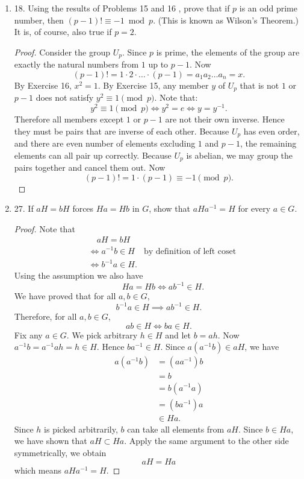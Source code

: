 \begin{enumerate}
\item 18. Using the results of Problems 15 and 16 , prove that if $p$ is an odd prime number, then $(p-1) ! \equiv-1 \bmod p$. (This is known as Wilson's Theorem.) It is, of course, also true if $p=2$. 
\begin{proof}
	Consider the group $U_p$. Since $p$ is prime, the elements of the group are exactly the natural numbers from $1$ up to $p -1$. Now
	\[
		(p-1)! = 1 \cdot 2 \cdot \ldots \cdot (p-1) =  a_1 a_2 \ldots a_n = x
	.\] 
By Exercise 16, $x^2 = 1$. By Exercise 15, any member $y$ of  $U_p$ that is not $1$ or $p -1$ does not satisfy $y^2 \equiv 1 \pmod p$. Note that: \[
	y^2 \equiv 1 \pmod p \iff y^2 = e \iff y = y^{-1} 
.\] 
Therefore all members except $1 $ or $p -1$ are not their own inverse. Hence they must be pairs that are inverse of each other. Because $U_p$ has even order, and there are even number of elements excluding $1$ and $p -1$, the remaining elements can all pair up correctly. Because  $U_p$ is abelian, we may group the pairs together and cancel them out. Now
\[
	(p-1)! = 1 \cdot (p-1) \equiv -1 \pmod p
.\] 
	
\end{proof}

\item 27. If $a H=b H$ forces $H a=H b$ in $G$, show that $a H a^{-1}=H$ for every $a \in G$. 
\begin{proof}
	Note that 
	\begin{align*}
		& \quad a H = b H \\
		& \iff a^{-1} b \in H  & \text{by definition of left coset}\\
		& \iff b^{-1}  a \in H
	.\end{align*}
	Using the assumption we also have
	\[
		\quad H a = H b 
		\iff a b^{-1}  \in H
		.
	\]
	We have proved that for all $a, b \in G$, \[
		b^{-1} a \in H \implies a b^{-1}  \in H
	.\] 
	Therefore, for all $a, b \in G$, 
	\[
		a b \in H \iff b a \in H
	.\] 
	Fix any $a \in G$. We pick arbitrary $h \in H$ and let $b = a h$. Now $a^{-1} b = a^{-1} a h = h \in H$. Hence $b a^{-1} \in H$. Since $a(a^{-1} b) \in a H$, we have
	\begin{align*}
		a(a^{-1} b)
		&= (a a^{-1} ) b \\
		&= b \\
		&= b (a^{-1} a) \\
		&= (b a^{-1} ) a \\
		&\in H a
	.\end{align*}
	Since $h$ is picked arbitrarily, $b$ can take all elements from $aH$. Since $b \in Ha$, we have shown that $aH \subset  Ha$. Apply the same argument to the other side symmetrically, we obtain \[
		aH = Ha
	\] 
	which means $aHa^{-1} = H$.
\end{proof}


\end{enumerate}
